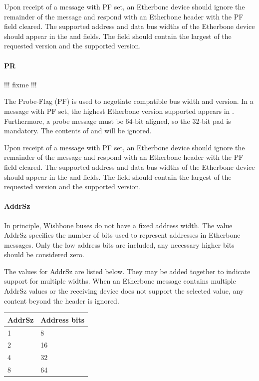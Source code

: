 \documentclass{article}
\begin{document}
Upon receipt of a message with PF set, 
an Etherbone device should ignore the remainder of the message
and respond with an Etherbone header with the PF field cleared.
The supported address and data bus widths of the Etherbone
device should appear in the  and  fields.
The  field should contain the largest of the
requested version and the supported version.

\paragraph{PR} \label{field:PR}

!!! fixme !!!

The Probe-Flag (PF) is used to negotiate compatible bus width and version.
In a message with PF set,
the highest Etherbone version supported appears in .
Furthermore, a probe message must be 64-bit aligned, so the 32-bit pad is mandatory.
The contents of  and  will be ignored.

Upon receipt of a message with PF set, 
an Etherbone device should ignore the remainder of the message
and respond with an Etherbone header with the PF field cleared.
The supported address and data bus widths of the Etherbone
device should appear in the  and  fields.
The  field should contain the largest of the
requested version and the supported version.

\paragraph{AddrSz} \label{field:AddrSz}

In principle, 
Wishbone buses do not have a fixed address width.
The value AddrSz specifies the number of bits used 
to represent addresses in Etherbone messages.
Only the low address bits are included,
any necessary higher bits should be considered zero.

The values for AddrSz are listed below.
They may be added together to indicate support for multiple widths.
When an Etherbone message contains multiple AddrSz values
or the receiving device does not support the selected value, 
any content beyond the header is ignored.

\vspace{1em}
\begin{tabular}{|l|l|}
\hline
AddrSz & Address bits \\
\hline
1 & 8 \\
2 & 16 \\
4 & 32 \\
8 & 64 \\
\hline
\end{tabular}
\end{document}
